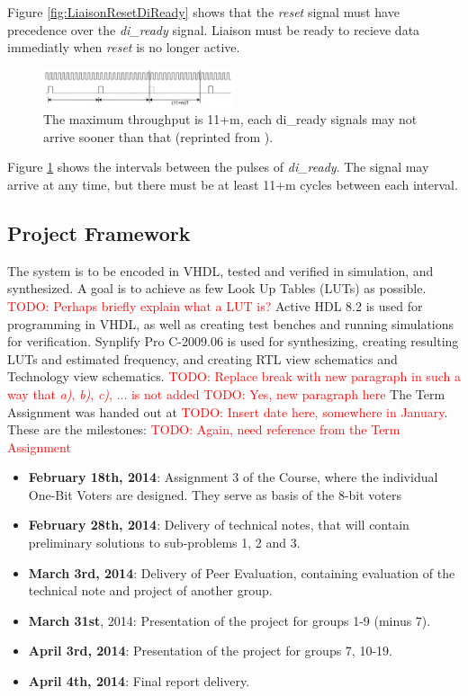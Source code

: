 \documentclass[a4paper]{IEEEtran}
\newcommand\TODO[1]{\textcolor{red}{TODO:#1}}
\newcommand\todo[1]{\TODO{#1}}
\begin{document}
Figure \ref{fig:LiaisonResetDiReady} shows that the \textit{reset} signal must have precedence over the \textit{di\_ready} signal. Liaison must be ready to recieve data immediatly when \textit{reset} is no longer active.

\begin{figure}[h!]
    \centering
    \includegraphics[width=0.5\textwidth]{Figures/ProjectDescription/LiaisonMaxThroughput}
    \caption{The maximum throughput is 11+m, each di\_ready signals may not arrive sooner than that (reprinted from \protect\cite{assignment-text}).}
    \label{fig:LiaisonMaxThroughput}
\end{figure}

Figure \ref{fig:LiaisonMaxThroughput} shows the intervals between the pulses of \textit{di\_ready}. The signal may arrive at any time, but there must be at least 11+m cycles between each interval.

\subsection{Project Framework}
The system is to be encoded in VHDL, tested and verified in simulation, and synthesized. A goal is to achieve as few Look Up Tables (LUTs) as possible. \todo{ Perhaps briefly explain what a LUT is?}
Active HDL 8.2 is used for programming in VHDL, as well as creating test benches and running simulations for verification.
Synplify Pro C-2009.06 is used for synthesizing, creating resulting LUTs and estimated frequency, and creating RTL view schematics and Technology view schematics. 
\break 
\todo{ Replace break with new paragraph in such a way that \textit{a)}, \textit{b)}, \textit{c)}, ... is not added}
\break
\todo{ Yes, new paragraph here} The Term Assignment was handed out at \todo{ Insert date here, somewhere in January}. These are the milestones: \todo{ Again, need reference from the Term Assignment}
\begin{itemize}
    \item \textbf{February 18th, 2014}: Assignment 3 of the Course, where the individual One-Bit Voters are designed. They serve as basis of the 8-bit voters
    \item \textbf{February 28th, 2014}: Delivery of technical notes, that will contain preliminary solutions to sub-problems 1, 2 and 3.
    \item \textbf{March 3rd, 2014}: Delivery of Peer Evaluation, containing evaluation of the technical note and project of another group.
    \item \textbf{March 31st}, 2014: Presentation of the project for groups 1-9 (minus 7).
    \item \textbf{April 3rd, 2014}: Presentation of the project for groups 7, 10-19.
    \item \textbf{April 4th, 2014}: Final report delivery.
\end{itemize}
\end{document}
